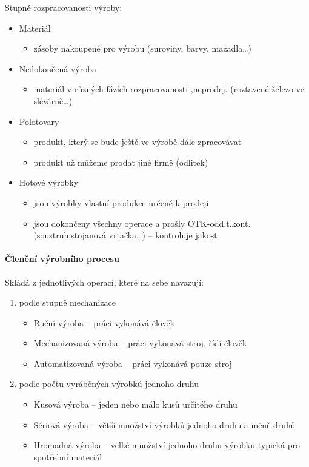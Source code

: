 \documentclass[11pt,a4paper,twoside]{book}
\begin{document}
	Stupně rozpracovanosti výroby:
	\begin{itemize}	
		\item Materiál
			\begin{itemize}
				\item zásoby nakoupené pro výrobu (suroviny, barvy, mazadla\ldots)
			\end{itemize}
		\item Nedokončená výroba
			\begin{itemize}
				\item materiál v různých fázích rozpracovanosti ,neprodej. (roztavené železo ve slévárně\ldots)
			\end{itemize}
		\item Polotovary
			\begin{itemize}
				\item produkt, který se bude ještě ve výrobě dále zpracovávat
				\item produkt už můžeme prodat jiné firmě (odlitek)
			\end{itemize}
		\item Hotové výrobky
			\begin{itemize}
				\item jsou výrobky vlastní produkce určené k prodeji
				\item jsou dokončeny všechny operace a prošly OTK-odd.t.kont. (soustruh,stojanová vrtačka\ldots) -- kontroluje jakost
			\end{itemize}
	\end{itemize}

	\paragraph*{Členění výrobního procesu}
	Skládá z jednotlivých operací, které na sebe navazují:
	\begin{enumerate}
		\item podle stupně mechanizace
			\begin{itemize}
				\item  Ruční výroba -- práci vykonává člověk
				\item  Mechanizovaná výroba -- práci vykonává stroj, řídí člověk
				\item  Automatizovaná výroba -- práci vykonává pouze stroj
			\end{itemize}
		\item podle počtu vyráběných výrobků jednoho druhu
			\begin{itemize}
				\item Kusová výroba -- jeden nebo málo kusů určitého druhu
				\item Sériová výroba -- větší množství výrobků jednoho druhu a méně druhů
				\item Hromadná výroba -- velké množství jednoho druhu výrobku typická pro spotřební materiál
			\end{itemize}
	\end{enumerate}
\end{document}
